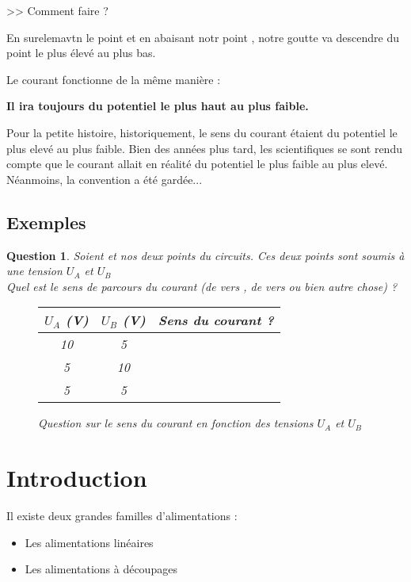 \documentclass[12pt]{report}
\newcommand{\Triangle}{$\blacktriangleright$}
\newenvironment{items}[2]
{      
        \begin{itemize}[font=\color{#1}, label=#2]  
    }
    { 
        \end{itemize}
}%
\renewcommand{\bold}[1]{\textbf{#1}}
\newtheorem{question}{Question}
\begin{document}
>> Comment faire ?

En surelemavtn le point \A et en abaisant notr point \B, notre goutte va descendre du point le plus élevé au plus bas.

Le courant fonctionne de la même manière : 

\bold{Il ira toujours du potentiel le plus haut au plus faible.}

Pour la petite histoire, historiquement, le sens du courant étaient du potentiel le plus elevé au plus faible.
Bien des années plus tard, les scientifiques se sont rendu compte que le courant allait en réalité du
potentiel le plus faible au plus elevé. Néanmoins, la convention a été gardée...


\subsection{Exemples}
\begin{question}
Soient \A et \B nos deux points du circuits. Ces deux points sont soumis à une tension $U_A$ et $U_B$\\
Quel est le sens de parcours du courant (de \A vers \B, de \B vers \A ou bien autre chose) ?

\begin{figure}[!h]
    \centering
\begin{tabular}{|c|c|c|}
    \hline
    $U_A$ (V) & $U_B$ (V) & Sens du courant ?\\
    \hline
    10 & 5 & \\
    \hline
    5 & 10 & \\
    \hline
    5 & 5 &\\
    \hline
\end{tabular}
\caption{Question sur le sens du courant en fonction des tensions $U_A$ et $U_B$}
\end{figure}
\end{question}
 

\section{Introduction}


Il existe deux grandes familles d'alimentations : 

\begin{items}{orange}{\Triangle}
    \item Les alimentations linéaires
    \item Les alimentations à découpages
\end{items}
\end{document}
